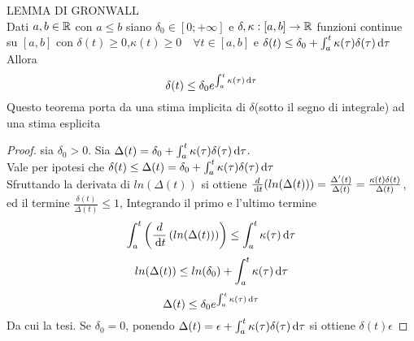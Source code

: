 \proposition LEMMA DI GRONWALL\\
Dati $a,b\in \mathbb{R}$ con $a\le b$ siano $\delta_0\in \left[ 0;+\infty \right]$ e $\delta,\kappa:\left[a,b\right]\to \mathbb{R}$ funzioni continue su $\left[a,b\right]$ con $\delta(t)\ge 0$,$\kappa(t)\ge 0 \quad \forall t\in\left[ a,b\right] $ e $\delta(t)\le \delta_0+\int_{a}^{t}\kappa(\tau)\delta(\tau)\,\mathrm{d}{\tau}$Allora $$\delta(t)\le\delta_0e^{\int_{a}^{t}\kappa(\tau)\,\mathrm{d}{\tau}}$$
Questo teorema porta da una stima implicita di $\delta$(sotto il segno di integrale) ad una stima esplicita 
\begin{proof}
	sia $\delta_0 > 0$. Sia $\Delta(t)=\delta_0+\int_{a}^{t}\kappa(\tau)\delta(\tau)\,\mathrm{d}{\tau}$.\\
	Vale per ipotesi che $\delta(t)\le\Delta(t)=\delta_0+\int_{a}^{t}\kappa(\tau)\delta(\tau)\,\mathrm{d}{\tau}$\\
	Sfruttando la derivata di $ln(\Delta(t))$ si ottiene $\frac{d}{\,\mathrm{d}{t}}(ln(\Delta(t)))= \frac{\Delta'(t)}{\Delta(t)}=\frac{\kappa(t)\delta(t)}{\Delta(t)}$, ed il termine $\frac{\delta(t)}{\Delta(t)}\le 1$, Integrando il primo e l'ultimo termine
	$$\int_{a}^{t}\left( \frac{d}{\,\mathrm{d}{t}}\left(ln(\Delta(t))\right) \right)\le\int_{a}^{t}\kappa(\tau)\,\mathrm{d}{\tau}$$
	$$ln(\Delta(t))\le ln(\delta_0)+\int_{a}^{t}\kappa(\tau)\,\mathrm{d}{\tau}$$
	$$ \Delta(t)\le\delta_0e^{\int_{a}^{t}\kappa(\tau)\,\mathrm{d}{\tau}} $$
	Da cui la tesi.
	Se $\delta_0=0$, ponendo $\Delta(t)=\epsilon+\int_{a}^{t}\kappa(\tau)\delta(\tau)\,\mathrm{d}{\tau}$ si ottiene $\delta(t)\epsilon$
\end{proof}


